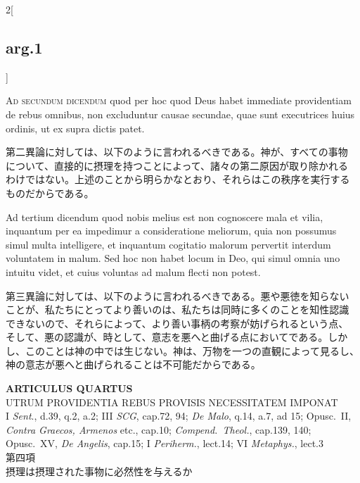 \documentclass[paper=a4paper,fontsize=10pt,jafontsize=9pt,titlepage]{jlreq}
\begin{document}
\begin{paracol}{2}[\subsection{arg.1}]
\switchcolumn*[\subsection{ad.2}]

{\scshape Ad secundum dicendum} quod per hoc quod Deus
habet immediate providentiam de rebus omnibus, non excluduntur causae
secundae, quae sunt executrices huius ordinis, ut ex supra dictis patet.

\switchcolumn

第二異論に対しては、以下のように言われるべきである。神が、すべての事物
について、直接的に摂理を持つことによって、諸々の第二原因が取り除かれる
わけではない。上述のことから明らかなとおり、それらはこの秩序を実行する
ものだからである。

\switchcolumn*

Ad tertium dicendum quod nobis melius est non
cognoscere mala et vilia, inquantum per ea impedimur a consideratione
meliorum, quia non possumus simul multa intelligere, et inquantum
cogitatio malorum pervertit interdum voluntatem in malum. Sed hoc non
habet locum in Deo, qui simul omnia uno intuitu videt, et cuius voluntas
ad malum flecti non potest.

\switchcolumn

第三異論に対しては、以下のように言われるべきである。悪や悪徳を知らない
ことが、私たちにとってより善いのは、私たちは同時に多くのことを知性認識
できないので、それらによって、より善い事柄の考察が妨げられるという点、
そして、悪の認識が、時として、意志を悪へと曲げる点においてである。しか
し、このことは神の中では生じない。神は、万物を一つの直観によって見るし、
神の意志が悪へと曲げられることは不可能だからである。

\end{paracol}
\newpage
{}
{}
\setcounter{section}{4}
\setcounter{subsection}{0}

\begin{center}
 {\Large {\bfseries ARTICULUS QUARTUS}}\\
 {\large UTRUM PROVIDENTIA REBUS PROVISIS NECESSITATEM IMPONAT}\\
 {\footnotesize I {\itshape Sent}., d.39, q.2, a.2; III {\itshape SCG},
 cap.72, 94; {\itshape De Malo}, q.14, a.7, ad 15; Opusc.~II, {\itshape
 Contra Graecos, Armenos} etc., cap.10; {\itshape Compend.~Theol.},
 cap.139, 140; Opusc.~XV, {\itshape De Angelis}, cap.15; I {\itshape
 Periherm.}, lect.14; VI {\itshape Metaphys.}, lect.3}\\
 {\Large 第四項\\摂理は摂理された事物に必然性を与えるか}
\end{center}
\end{document}

